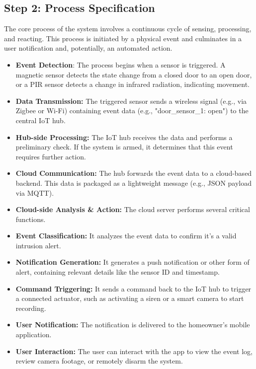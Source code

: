 \documentclass[conference]{IEEEtran}
\begin{document}
\subsection{Step 2: Process Specification}
The core process of the system involves a continuous cycle of sensing, processing, and reacting. This process is initiated by a physical event and culminates in a user notification and, potentially, an automated action.
\begin{itemize}
    \item \textbf{Event Detection}: The process begins when a sensor is triggered. A magnetic sensor detects the state change from a closed door to an open door, or a PIR sensor detects a change in infrared radiation, indicating movement.
    \item \textbf{Data Transmission:} The triggered sensor sends a wireless signal (e.g., via Zigbee or Wi-Fi) containing event data (e.g., "door\_sensor\_1: open") to the central IoT hub.
    \item \textbf{Hub-side Processing:} The IoT hub receives the data and performs a preliminary check. If the system is armed, it determines that this event requires further action.
    \item \textbf{Cloud Communication:} The hub forwards the event data to a cloud-based backend. This data is packaged as a lightweight message (e.g., JSON payload via MQTT).
    \item \textbf{Cloud-side Analysis \& Action:} The cloud server performs several critical functions.
    \item \textbf{Event Classification:} It analyzes the event data to confirm it's a valid intrusion alert.
    \item \textbf{Notification Generation:} It generates a push notification or other form of alert, containing relevant details like the sensor ID and timestamp.
    \item \textbf{Command Triggering:} It sends a command back to the IoT hub to trigger a connected actuator, such as activating a siren or a smart camera to start recording.
    \item \textbf{User Notification:} The notification is delivered to the homeowner's mobile application.
    \item \textbf{User Interaction:} The user can interact with the app to view the event log, review camera footage, or remotely disarm the system.
\end{itemize}
\end{document}
